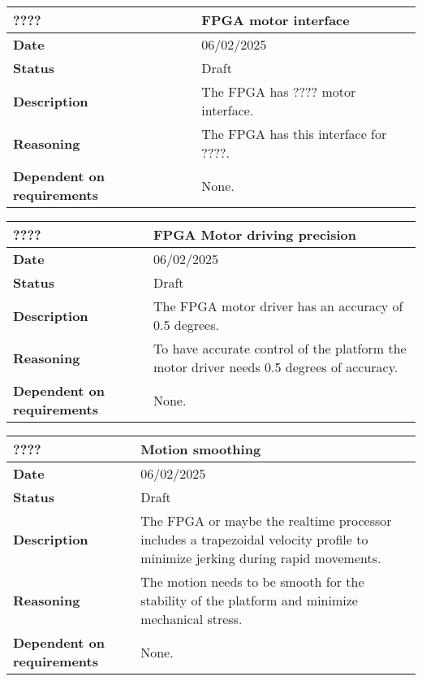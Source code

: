 \documentclass{article}
\begin{document}
\begin{table}[H]
    \renewcommand{\arraystretch}{1.3}
    \begin{tabular}{|l|p{10cm}|}
        \hline
        \rowcolor{gray!50}
        \textbf{????} & \textbf{FPGA motor interface} \\ \hline
        \textbf{Date} & 06/02/2025 \\ \hline
        \textbf{Status} & Draft \\ \hline
        \textbf{Description} & The FPGA has ???? motor interface. \\ \hline
        \textbf{Reasoning} & The FPGA has this interface for ????. \\ \hline
        \textbf{Dependent on requirements} & None. \\ \hline
    \end{tabular}
\end{table}

\begin{table}[H]
    \renewcommand{\arraystretch}{1.3}
    \begin{tabular}{|l|p{10cm}|}
        \hline
        \rowcolor{gray!50}
        \textbf{????} & \textbf{FPGA Motor driving precision} \\ \hline
        \textbf{Date} & 06/02/2025 \\ \hline
        \textbf{Status} & Draft \\ \hline
        \textbf{Description} & The FPGA motor driver has an accuracy of 0.5 degrees. \\ \hline
        \textbf{Reasoning} & To have accurate control of the platform the motor driver needs 0.5 degrees of accuracy. \\ \hline
        \textbf{Dependent on requirements} & None. \\ \hline
    \end{tabular}
\end{table}

\begin{table}[H]
    \renewcommand{\arraystretch}{1.3}
    \begin{tabular}{|l|p{10cm}|}
        \hline
        \rowcolor{gray!50}
        \textbf{????} & \textbf{Motion smoothing} \\ \hline
        \textbf{Date} & 06/02/2025 \\ \hline
        \textbf{Status} & Draft \\ \hline
        \textbf{Description} & The FPGA or maybe the realtime processor includes a trapezoidal velocity profile to minimize jerking during rapid movements. \\ \hline
        \textbf{Reasoning} & The motion needs to be smooth for the stability of the platform and minimize mechanical stress. \\ \hline
        \textbf{Dependent on requirements} & None. \\ \hline
    \end{tabular}
\end{table}
\end{document}
